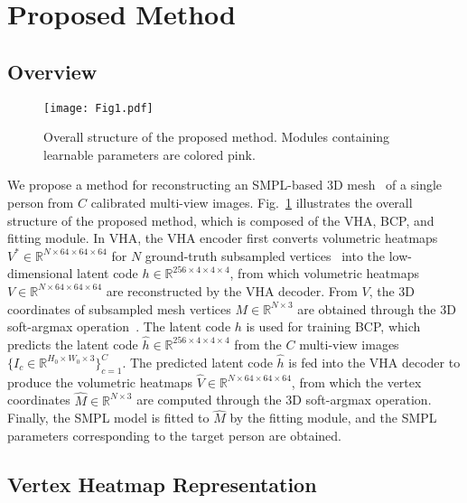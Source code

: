 \documentclass{article}
\begin{document}
\section{Proposed Method}
\label{sec:proposed_method}

\subsection{Overview}
\label{ssec:overview}

\begin{figure}[t]
\centering
\texttt{[image: Fig1.pdf]}
\caption{Overall structure of the proposed method. Modules containing learnable parameters are colored pink.}
\label{fig:overview}
\end{figure}

We propose a method for reconstructing an SMPL-based 3D mesh~\cite{2015_SMPL} of a single person from $C$ calibrated multi-view images. Fig.~\ref{fig:overview} illustrates the overall structure of the proposed method, which is composed of the VHA, BCP, and fitting module. In VHA, the VHA encoder first converts volumetric heatmaps $V^{*}\in{}\mathbb{R}^{{N}\times{}64\times{}64\times{}64}$ for $N$ ground-truth subsampled vertices~\cite{Chun_2023_WACV} into the low-dimensional latent code $h\in{}\mathbb{R}^{256\times{}4\times{}4\times{}4}$, from which volumetric heatmaps $V\in{}\mathbb{R}^{{N}\times{}64\times{}64\times{}64}$ are reconstructed by the VHA decoder. From $V$, the 3D coordinates of subsampled mesh vertices $M\in{}\mathbb{R}^{N\times{}3}$ are obtained through the 3D soft-argmax operation~\cite{2018_Sun, 2019_LT, Chun_2023_WACV}. The latent code $h$ is used for training BCP, which predicts the latent code $\hat{h}\in{}\mathbb{R}^{256\times{}4\times{}4\times{}4}$ from the $C$ multi-view images $\{I_{c}\in{}\mathbb{R}^{H_{0}\times{}W_{0}\times{}3}\}_{c=1}^{C}$. The predicted latent code $\hat{h}$ is fed into the VHA decoder to produce the volumetric heatmaps $\hat{V}\in{}\mathbb{R}^{N\times{}64\times{}64\times{}64}$, from which the vertex coordinates $\hat{M}\in{}\mathbb{R}^{N\times{}3}$ are computed through the 3D soft-argmax operation. Finally, the SMPL model is fitted to $\hat{M}$ by the fitting module, and the SMPL parameters corresponding to the target person are obtained.


\subsection{Vertex Heatmap Representation}
\label{ssec:heatmap_representation}
\end{document}
